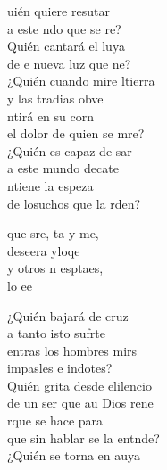 \begin{cancion}%
	uién quiere resutar \\
	a este ndo que se re?\\
	Quién cantará el luya\\
	de e nueva luz que ne?\\
	\jump
	¿Quién cuando mire ltierra \\
	y las tradias obve\\
	ntirá en su corn \\
	el dolor de quien se mre?\\
	\jump
	¿Quién es capaz de sar \\
	a este mundo decate\\
	ntiene la espeza \\
	de losuchos que la rden?\jump\\
	\begin{chorus}%
		que sre, ta y me, \\
		deseera yloqe\\
		y otros n esptaes, \\
		lo ee \jump\\
	\end{chorus}%
	¿Quién bajará de  cruz \\
	a tanto isto sufrte\\
	entras los hombres mirs \\
	impasles e indotes?\\
	\jump
	Quién grita desde elilencio \\
	de un ser que au Dios rene\\
	rque se hace para \\
	que sin hablar se la entnde?\\
	\jump
	¿Quién se torna en auya\\

\end{cancion}
